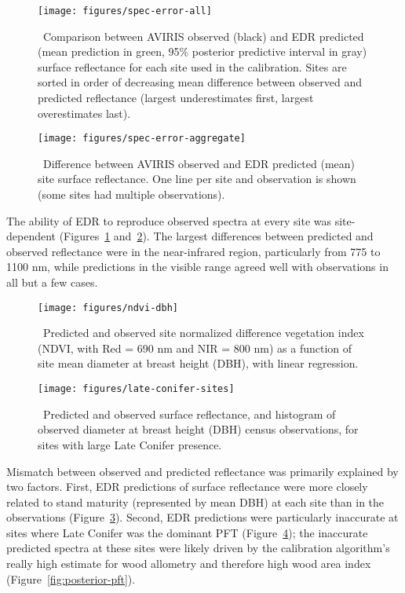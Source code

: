 \begin{figure}
  \centering
  \texttt{[image: figures/spec-error-all]}
  \caption{\label{fig:spec-error-all}\
    Comparison between AVIRIS observed (black)
    and EDR predicted (mean prediction in green, 95\% posterior predictive interval in gray)
    surface reflectance for each site used in the calibration.
    Sites are sorted in order of decreasing mean difference between observed and predicted reflectance
    (largest underestimates first, largest overestimates last).
  }
\end{figure}

\begin{figure}
  \centering
  \texttt{[image: figures/spec-error-aggregate]}
  \caption{\label{fig:spec-error-aggregate}\
    Difference between AVIRIS observed and EDR predicted (mean) site surface reflectance.
    One line per site and observation is shown (some sites had multiple observations).
  }
\end{figure}

The ability of EDR to reproduce observed spectra at every site was site-dependent (Figures~\ref{fig:spec-error-all} and~\ref{fig:spec-error-aggregate}).
The largest differences between predicted and observed reflectance were in the near-infrared region, particularly from 775 to 1100 nm,
while predictions in the visible range agreed well with observations in all but a few cases.

\begin{figure}[ht]
  \centering
  \texttt{[image: figures/ndvi-dbh]}
  \caption{\label{fig:ndvi-dbh}\
    Predicted and observed site normalized difference vegetation index (NDVI, with Red = 690 nm and NIR = 800 nm)
    as a function of site mean diameter at breast height (DBH), with linear regression.
  }
\end{figure}

\begin{figure}[ht]
  \centering
  \texttt{[image: figures/late-conifer-sites]}
  \caption{\label{fig:late-conifer-sites}\
    Predicted and observed surface reflectance, and histogram of observed diameter at breast height (DBH) census observations,
    for sites with large Late Conifer presence.
  }
\end{figure}

Mismatch between observed and predicted reflectance was primarily explained by two factors.
First, EDR predictions of surface reflectance were more closely related to stand maturity (represented by mean DBH) at each site than in the observations (Figure~\ref{fig:ndvi-dbh}).
Second, EDR predictions were particularly inaccurate at sites where Late Conifer was the dominant PFT (Figure~\ref{fig:late-conifer-sites});
the inaccurate predicted spectra at these sites were likely driven by the calibration algorithm's really high estimate for wood allometry and therefore high wood area index (Figure~\ref{fig:posterior-pft}).

